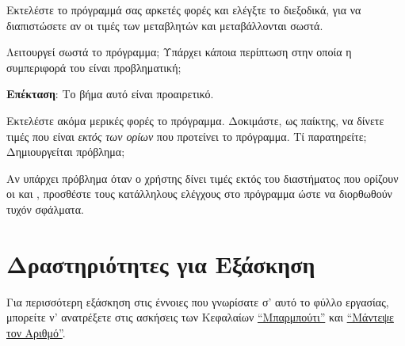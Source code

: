 \documentclass[a4paper,11pt,oneside]{book}
\begin{document}
\begin{step}
Εκτελέστε το πρόγραμμά σας αρκετές φορές και ελέγξτε το διεξοδικά, για να διαπιστώσετε αν οι τιμές των μεταβλητών  και  μεταβάλλονται σωστά.

Λειτουργεί σωστά το πρόγραμμα; Υπάρχει κάποια περίπτωση στην οποία η συμπεριφορά του είναι προβληματική; 

\marginnote[14pt]{\icondiscuss}
\dottedline

\dottedline
\end{step}

\begin{step}
\begin{note}
\textbf{Επέκταση}: Το βήμα αυτό είναι προαιρετικό. 
\end{note}

Εκτελέστε ακόμα μερικές φορές το πρόγραμμα. Δοκιμάστε, ως παίκτης, να δίνετε τιμές που είναι \emph{εκτός των ορίων} που προτείνει το πρόγραμμα. Τί παρατηρείτε; Δημιουργείται πρόβλημα;

\marginnote[14pt]{\icondiscuss}
\dottedline

\dottedline

Αν υπάρχει πρόβλημα όταν ο χρήστης δίνει τιμές εκτός του διαστήματος που ορίζουν οι  και , προσθέστε τους κατάλληλους ελέγχους στο πρόγραμμα ώστε να διορθωθούν τυχόν σφάλματα.
\end{step}

\section{Δραστηριότητες για Εξάσκηση}

%
Για περισσότερη εξάσκηση στις έννοιες που γνωρίσατε σ' αυτό το φύλλο εργασίας, μπορείτε ν' ανατρέξετε στις ασκήσεις των %
Κεφαλαίων \href{http://pythonies.mysch.gr/chapters/craps.pdf}{``Μπαρμπούτι''} και \href{http://pythonies.mysch.gr/chapters/guess.pdf}{``Μάντεψε τον Αριθμό''}.
\end{document}
